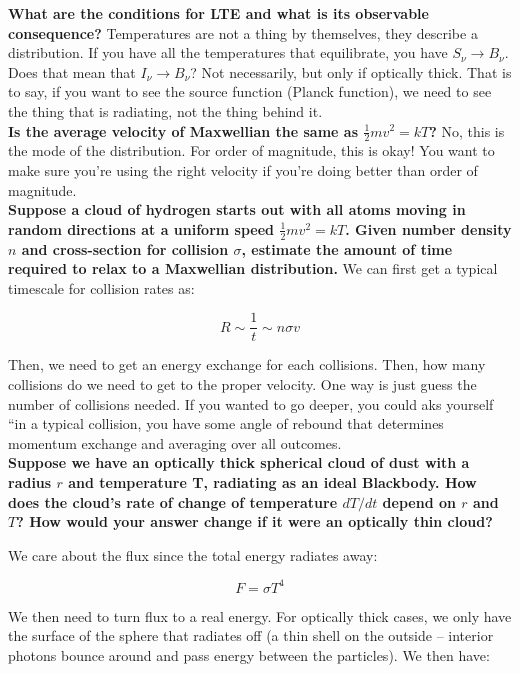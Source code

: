 \documentclass{article}
\begin{document}
\textbf{What are the conditions for LTE and what is its observable consequence?} Temperatures are not a thing by themselves, they describe a distribution. If you have all the temperatures that equilibrate, you have $S_\nu \rightarrow B_\nu$. Does that mean that $I_\nu \rightarrow B_\nu$? Not necessarily, but only if optically thick. That is to say, if you want to see the source function (Planck function), we need to see the thing that is radiating, not the thing behind it.\\

\textbf{Is the average velocity of Maxwellian the same as $\frac12 mv^2 = kT$?} No, this is the mode of the distribution. For order of magnitude, this is okay! You want to make sure you're using the right velocity if you're doing better than order of magnitude. \\

\textbf{Suppose a cloud of hydrogen starts out with all atoms moving in random directions at a uniform speed $\frac12 mv^2=kT$. Given number density $n$ and cross-section for collision $\sigma$, estimate the amount of time required to relax to a Maxwellian distribution.} We can first get a typical timescale for collision rates as:

\begin{equation}
    R \sim \frac{1}{t} \sim n \sigma v
\end{equation}

Then, we need to get an energy exchange for each collisions. Then, how many collisions do we need to get to the proper velocity. One way is just guess the number of collisions needed. If you wanted to go deeper, you could aks yourself ``in a typical collision, you have some angle of rebound that determines momentum exchange and averaging over all outcomes. \\

\textbf{Suppose we have an optically thick spherical cloud of dust with a radius $r$ and temperature T, radiating as an ideal Blackbody. How does the cloud's rate of change of temperature $dT/dt$ depend on $r$ and $T$? How would your answer change if it were an optically thin cloud?} 

We care about the flux since the total energy radiates away:

\begin{equation}
    F = \sigma T^4
\end{equation}

We then need to turn flux to a real energy. For optically thick cases, we only have the surface of the sphere that radiates off (a thin shell on the outside -- interior photons bounce around and pass energy between the particles). We then have:
\end{document}
